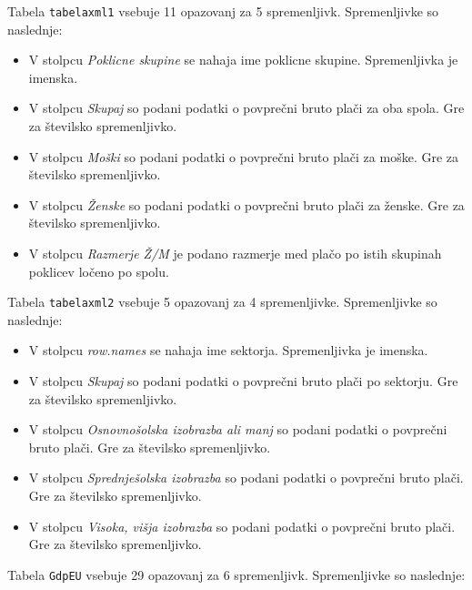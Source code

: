 \documentclass[11pt,a4paper]{article}
\begin{document}
Tabela \verb|tabelaxml1| vsebuje 11 opazovanj za 5 spremenljivk. Spremenljivke so naslednje:

\begin{itemize}
  \item V stolpcu \textit{Poklicne skupine} se nahaja ime poklicne skupine. Spremenljivka je imenska.
  \item V stolpcu \textit{Skupaj} so podani podatki o povprečni bruto plači za oba spola. Gre za številsko spremenljivko.
  \item V stolpcu \textit{Moški} so podani podatki o povprečni bruto plači za moške. Gre za številsko spremenljivko.
  \item V stolpcu \textit{Ženske} so podani podatki o povprečni bruto plači za ženske. Gre za številsko spremenljivko.
   \item V stolpcu \textit{Razmerje Ž/M} je podano razmerje med plačo po istih skupinah poklicev ločeno po spolu.
\end{itemize}

Tabela \verb|tabelaxml2| vsebuje 5 opazovanj za 4 spremenljivke. Spremenljivke so naslednje:

\begin{itemize}
  \item V stolpcu \textit{row.names} se nahaja ime sektorja. Spremenljivka je imenska.
  \item V stolpcu \textit{Skupaj} so podani podatki o povprečni bruto plači po sektorju. Gre za številsko spremenljivko.
  \item V stolpcu \textit{Osnovnošolska izobrazba ali manj} so podani podatki o povprečni bruto plači. Gre za številsko spremenljivko.
  \item V stolpcu \textit{Sprednješolska izobrazba} so podani podatki o povprečni bruto plači. Gre za številsko spremenljivko.
   \item V stolpcu \textit{Visoka, višja izobrazba} so podani podatki o povprečni bruto plači. Gre za številsko spremenljivko.
\end{itemize}

Tabela \verb|GdpEU| vsebuje 29 opazovanj za 6 spremenljivk. Spremenljivke so naslednje:
\end{document}
